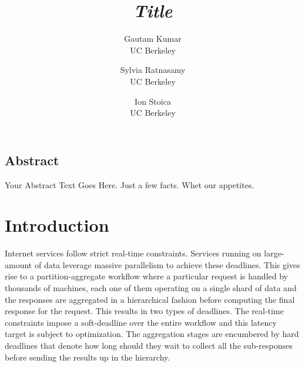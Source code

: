 \documentclass[letterpaper,twocolumn,10pt]{article}
\begin{document}
\newcommand{\notegk}[1]{\textcolor{red}{[G: #1]}}
\newcommand{\noteion}[1]{\textcolor{blue}{[I: #1]}}
\date{}

\title{\huge \textit{Title}}

\author{
{\rm Gautam Kumar}\\
UC Berkeley
\and
{\rm Sylvia Ratnasamy}\\
UC Berkeley
\and
{\rm Ion Stoica}\\
UC Berkeley
} %

\maketitle



\subsection*{Abstract}
Your Abstract Text Goes Here.  Just a few facts.
Whet our appetites.

\section{Introduction}
Internet services follow strict real-time constraints. 
Services running on large-amount of data leverage massive parallelism to achieve these deadlines. 
This gives rise to a partition-aggregate workflow where a particular request is handled by thousands of machines, 
each one of them operating on a single shard of data and the responses are aggregated in a hierarchical fashion 
before computing the final response for the request. 
This results in two types of deadlines. 
The real-time constraints impose a soft-deadline over the entire workflow and this latency target is subject to optimization. 
The aggregation stages are encumbered by hard deadlines that denote how long should they wait to collect all the sub-responses
before sending the results up in the hierarchy. 
\end{document}
